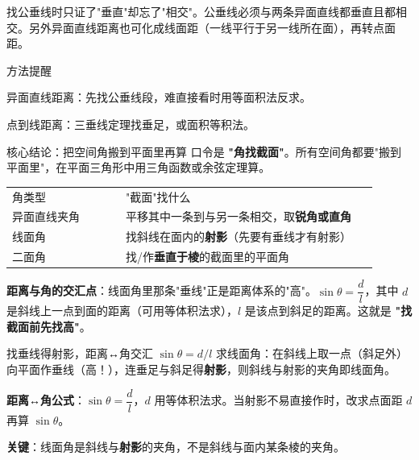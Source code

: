 \documentclass{exam-zh}
\begin{document}
\begin{eduMistakeBox}
找公垂线时只证了"垂直"却忘了"相交"。公垂线必须与两条异面直线都垂直且都相交。另外异面直线距离也可化成线面距（一线平行于另一线所在面），再转点面距。\end{eduMistakeBox}




\begin{eduSummaryBlock}{\eduIconPin}{方法提醒}
\begin{eduBulletList}
  \item 异面直线距离：先找公垂线段，难直接看时用等面积法反求。  \item 点到线距离：三垂线定理找垂足，或面积等积法。\end{eduBulletList}
\end{eduSummaryBlock}



\clearpage
{}


\begin{eduSolutionBox}{核心结论：把空间角搬到平面里再算}
  \begingroup
  \setlength{\parskip}{2.5mm}
口令是 \textbf{"角找截面"}。所有空间角都要"搬到平面里"，在平面三角形中用三角函数或余弦定理算。\par
\begin{tabular}{p{0.28\linewidth}p{0.62\linewidth}}
角类型 & "截面"找什么\\
异面直线夹角 & 平移其中一条到与另一条相交，取\textbf{锐角或直角}\\
线面角 & 找斜线在面内的\textbf{射影}（先要有垂线才有射影）\\
二面角 & 找/作\textbf{垂直于棱}的截面里的平面角
\end{tabular}
\par
\textbf{距离与角的交汇点}：线面角里那条"垂线"正是距离体系的"高"。$\sin\theta=\dfrac{d}{l}$，其中 $d$ 是斜线上一点到面的距离（可用等体积法求），$l$ 是该点到斜足的距离。这就是 \textbf{"找截面前先找高"}。\par
  \endgroup
\end{eduSolutionBox}



\clearpage
{}


\begin{eduSolutionBox}{找垂线得射影，距离↔角交汇 $\sin\theta=d/l$}
  \begingroup
  \setlength{\parskip}{2.5mm}
求线面角：在斜线上取一点（斜足外）向平面作垂线（高！），连垂足与斜足得\textbf{射影}，则斜线与射影的夹角即线面角。\par
\textbf{距离↔角公式}：$\sin\theta=\dfrac{d}{l}$，$d$ 用等体积法求。当射影不易直接作时，改求点面距 $d$ 再算 $\sin\theta$。\par
\textbf{关键}：线面角是斜线与\textbf{射影}的夹角，不是斜线与面内某条棱的夹角。\par
  \endgroup
\end{eduSolutionBox}
\end{document}
